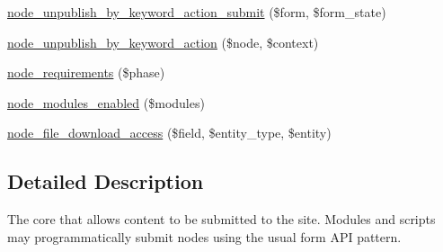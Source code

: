 \begin{DoxyCompactItemize}
\item 
\hyperlink{node_8module_a26e6379bcb14b8b4f694567e17c3cd6e}{node\_\-unpublish\_\-by\_\-keyword\_\-action\_\-submit} (\$form, \$form\_\-state)
\item 
\hyperlink{group__actions_gaa453e8f47436b80070213abd851535d0}{node\_\-unpublish\_\-by\_\-keyword\_\-action} (\$node, \$context)
\item 
\hyperlink{node_8module_a69330298fa1d167f0cfaec1cea81f0dd}{node\_\-requirements} (\$phase)
\item 
\hyperlink{node_8module_a63f6e95d242dbc0d8acf8f31413c0ab3}{node\_\-modules\_\-enabled} (\$modules)
\item 
\hyperlink{node_8module_adba6b7e58eca64bcca36f8cc40597f45}{node\_\-file\_\-download\_\-access} (\$field, \$entity\_\-type, \$entity)
\end{DoxyCompactItemize}


\subsection{Detailed Description}
The core that allows content to be submitted to the site. Modules and scripts may programmatically submit nodes using the usual form API pattern. 

